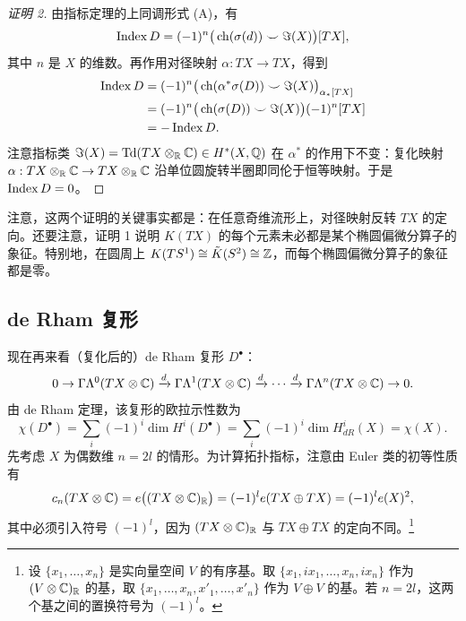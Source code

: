 
\begin{proof}[证明 2]
由指标定理的上同调形式 (A)，有
\[
\operatorname{Index} D=(-1)^n\big(\operatorname{ch}(\sigma(d))\smile\Im(X)\big)[TX],
\]
其中 $n$ 是 $X$ 的维数。再作用对径映射 $\alpha:TX\to TX$，得到
\[
\begin{aligned}
\operatorname{Index} D&=(-1)^n\big(\operatorname{ch}(\alpha^*\sigma(D))\smile\Im(X)\big)_{\alpha_*[TX]}\\
&=(-1)^n\big(\operatorname{ch}(\sigma(D))\smile\Im(X)\big)(-1)^n[TX]\\
&=-\operatorname{Index} D.
\end{aligned}
\]
注意指标类 $\Im(X)=\operatorname{Td}(TX\otimes_{\mathbb{R}}\mathbb{C})\in H^*(X,\mathbb{Q})$ 在 $\alpha^*$ 的作用下不变：复化映射 $\alpha:TX\otimes_{\mathbb{R}}\mathbb{C}\to TX\otimes_{\mathbb{R}}\mathbb{C}$ 沿单位圆旋转半圈即同伦于恒等映射。于是 $\operatorname{Index} D=0$。
\end{proof}

注意，这两个证明的关键事实都是：在任意奇维流形上，对径映射反转 $TX$ 的定向。还要注意，证明 1 说明 $K(TX)$ 的每个元素未必都是某个椭圆偏微分算子的象征。特别地，在圆周上 $K(TS^1)\cong\tilde K(S^2)\cong\mathbb{Z}$，而每个椭圆偏微分算子的象征都是零。

\subsection{de Rham 复形}

现在再来看（复化后的）de Rham 复形 $D^\bullet$：
\[
0\to\Gamma\Lambda^0(TX\otimes\mathbb{C})\xrightarrow{d}\Gamma\Lambda^1(TX\otimes\mathbb{C})
\xrightarrow{d}\cdots\xrightarrow{d}\Gamma\Lambda^n(TX\otimes\mathbb{C})\to 0.
\]
由 de Rham 定理，该复形的欧拉示性数为
\[
\chi(D^\bullet)=\sum_i(-1)^i\dim H^i(D^\bullet)=\sum_i(-1)^i\dim H^i_{dR}(X)=\chi(X).
\]
先考虑 $X$ 为偶数维 $n=2l$ 的情形。为计算拓扑指标，注意由 Euler 类的初等性质有
\[
c_n(TX\otimes\mathbb{C})=e\big((TX\otimes\mathbb{C})_{\mathbb{R}}\big)=(-1)^le(TX\oplus TX)=(-1)^le(X)^2,
\]
其中必须引入符号 $(-1)^l$，因为 $(TX\otimes\mathbb{C})_{\mathbb{R}}$ 与 $TX\oplus TX$ 的定向不同。\footnote{设 $\{x_1,\ldots,x_n\}$ 是实向量空间 $V$ 的有序基。取 $\{x_1,ix_1,\ldots,x_n,ix_n\}$ 作为 $(V\otimes\mathbb{C})_{\mathbb{R}}$ 的基，取 $\{x_1,\ldots,x_n,x'_1,\ldots,x'_n\}$ 作为 $V\oplus V$ 的基。若 $n=2l$，这两个基之间的置换符号为 $(-1)^l$。}


